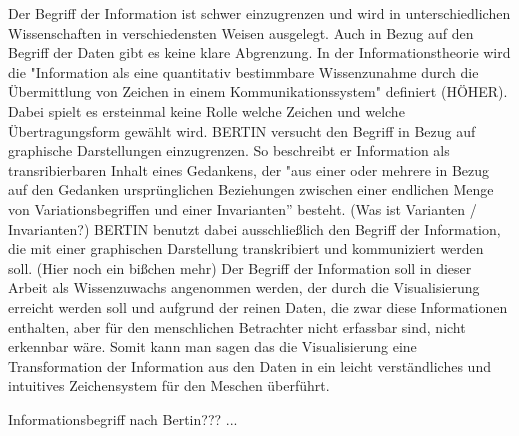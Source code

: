 \documentclass[a4paper, 12pt, DIVcalc, onepage, pdftex, headsepline, footsepline]{scrreprt}
\begin{document}
Der Begriff der Information ist schwer einzugrenzen und wird in unterschiedlichen Wissenschaften
in verschiedensten Weisen ausgelegt. Auch in Bezug auf den Begriff der Daten gibt es keine klare Abgrenzung.
In der Informationstheorie wird die "Information als eine quantitativ
bestimmbare Wissenzunahme durch die Übermittlung von Zeichen in einem Kommunikationssystem" definiert (HÖHER).
Dabei spielt es ersteinmal keine Rolle welche Zeichen und welche Übertragungsform gewählt wird.
BERTIN versucht den Begriff in Bezug auf graphische Darstellungen einzugrenzen. So beschreibt er Information
als transribierbaren Inhalt eines Gedankens, der "aus einer oder mehrere in Bezug auf den Gedanken
ursprünglichen Beziehungen zwischen einer endlichen Menge von Variationsbegriffen und einer Invarianten” besteht.
(Was ist Varianten / Invarianten?)
BERTIN benutzt dabei ausschließlich den Begriff der Information, die mit einer graphischen Darstellung transkribiert
und kommuniziert werden soll.
(Hier noch ein bißchen mehr)
Der Begriff der Information soll in dieser Arbeit als Wissenzuwachs angenommen werden, der durch die
Visualisierung erreicht werden soll und aufgrund der reinen Daten, die zwar diese Informationen enthalten,
aber für den menschlichen Betrachter nicht erfassbar sind, nicht erkennbar wäre. Somit kann man sagen das die
Visualisierung eine Transformation der Information aus den Daten in ein leicht verständliches und intuitives
Zeichensystem für den Meschen überführt.

Informationsbegriff nach Bertin???
...
\end{document}
